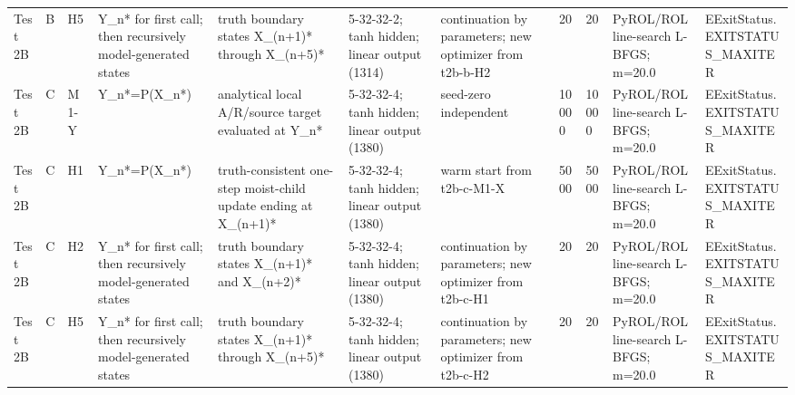 \begin{tabular}{lllllllllll}
Test 2B & B & H5 & Y\_n* for first call; then recursively model-generated states & truth boundary states X\_(n+1)* through X\_(n+5)* & 5-32-32-2; tanh hidden; linear output (1314) & continuation by parameters; new optimizer from t2b-b-H2 & 20 & 20 & PyROL/ROL line-search L-BFGS; m=20.0 & EExitStatus.EXITSTATUS\_MAXITER \\
Test 2B & C & M1-Y & Y\_n*=P(X\_n*) & analytical local A/R/source target evaluated at Y\_n* & 5-32-32-4; tanh hidden; linear output (1380) & seed-zero independent & 10000 & 10000 & PyROL/ROL line-search L-BFGS; m=20.0 & EExitStatus.EXITSTATUS\_MAXITER \\
Test 2B & C & H1 & Y\_n*=P(X\_n*) & truth-consistent one-step moist-child update ending at X\_(n+1)* & 5-32-32-4; tanh hidden; linear output (1380) & warm start from t2b-c-M1-X & 5000 & 5000 & PyROL/ROL line-search L-BFGS; m=20.0 & EExitStatus.EXITSTATUS\_MAXITER \\
Test 2B & C & H2 & Y\_n* for first call; then recursively model-generated states & truth boundary states X\_(n+1)* and X\_(n+2)* & 5-32-32-4; tanh hidden; linear output (1380) & continuation by parameters; new optimizer from t2b-c-H1 & 20 & 20 & PyROL/ROL line-search L-BFGS; m=20.0 & EExitStatus.EXITSTATUS\_MAXITER \\
Test 2B & C & H5 & Y\_n* for first call; then recursively model-generated states & truth boundary states X\_(n+1)* through X\_(n+5)* & 5-32-32-4; tanh hidden; linear output (1380) & continuation by parameters; new optimizer from t2b-c-H2 & 20 & 20 & PyROL/ROL line-search L-BFGS; m=20.0 & EExitStatus.EXITSTATUS\_MAXITER \\
\hline
\end{tabular}
